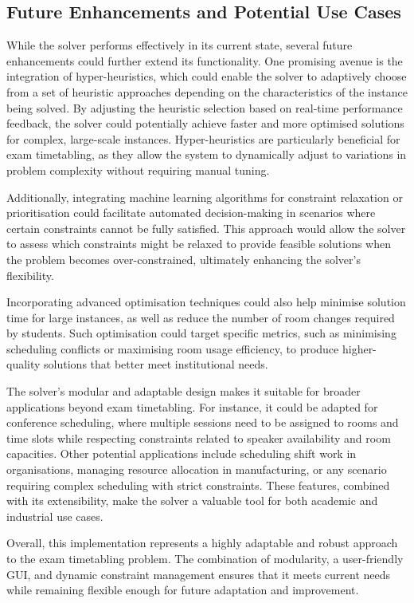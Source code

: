 \documentclass[a4paper]{article}
\begin{document}
    \subsection{Future Enhancements and Potential Use Cases}
    While the solver performs effectively in its current state, several future enhancements could further extend its functionality. One promising avenue is the integration of hyper-heuristics, which could enable the solver to adaptively choose from a set of heuristic approaches depending on the characteristics of the instance being solved. By adjusting the heuristic selection based on real-time performance feedback, the solver could potentially achieve faster and more optimised solutions for complex, large-scale instances. Hyper-heuristics are particularly beneficial for exam timetabling, as they allow the system to dynamically adjust to variations in problem complexity without requiring manual tuning.
    
    Additionally, integrating machine learning algorithms for constraint relaxation or prioritisation could facilitate automated decision-making in scenarios where certain constraints cannot be fully satisfied. This approach would allow the solver to assess which constraints might be relaxed to provide feasible solutions when the problem becomes over-constrained, ultimately enhancing the solver’s flexibility.
    
    Incorporating advanced optimisation techniques could also help minimise solution time for large instances, as well as reduce the number of room changes required by students. Such optimisation could target specific metrics, such as minimising scheduling conflicts or maximising room usage efficiency, to produce higher-quality solutions that better meet institutional needs.
    
    The solver’s modular and adaptable design makes it suitable for broader applications beyond exam timetabling. For instance, it could be adapted for conference scheduling, where multiple sessions need to be assigned to rooms and time slots while respecting constraints related to speaker availability and room capacities. Other potential applications include scheduling shift work in organisations, managing resource allocation in manufacturing, or any scenario requiring complex scheduling with strict constraints. These features, combined with its extensibility, make the solver a valuable tool for both academic and industrial use cases.
    
    Overall, this implementation represents a highly adaptable and robust approach to the exam \newline timetabling problem. The combination of modularity, a user-friendly GUI, and dynamic constraint management ensures that it meets current needs while remaining flexible enough for future adaptation and improvement.
    
\end{document}
